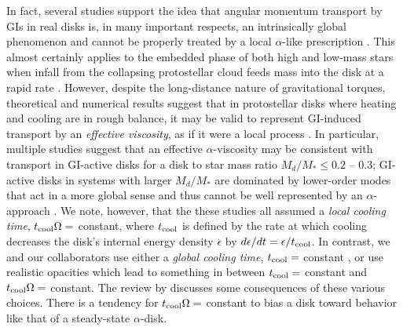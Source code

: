 \documentclass[manuscript]{aastex}
\begin{document}
In fact, several studies support the idea that angular momentum transport by GIs in real disks is, in many important respects, an intrinsically global phenomenon and cannot be properly treated by a local $\alpha$-like prescription \citep{laughlin1996, balbus1999, lodato2005, mejia2005, boley2006, cai2008}.  This almost certainly applies to the embedded phase of both high and low-mass stars when infall from the collapsing protostellar cloud feeds mass into the disk at a rapid
rate \citep[e.g.,][]{yorke1993, laughlin1994, yorke1999,vorobyov2005,vorobyov2006,kratter2010,walch2010}.  
However, despite the long-distance nature of gravitational torques, theoretical and numerical results suggest that in protostellar disks where heating and cooling are in rough balance, 
 it may be valid to represent GI-induced transport by an {\it effective viscosity}, as if it were a local process \citep{gammie2001, lodato2004, rice2005, cossins2009, vorobyov2010}.  In particular, multiple studies suggest that
an effective $\alpha$-viscosity may be consistent
with transport in GI-active disks for a disk to star mass ratio $M_d/M_* \le 0.2$ -- 0.3; GI-active disks
in systems with larger $M_d/M_*$ are dominated by lower-order modes that act in a more global sense and thus cannot be well represented by an $\alpha$-approach
\citep{lodato2004, cossins2009, vorobyov2010}. 
We note, however, that the these studies all assumed
a {\it local cooling time}, $t_{\rm cool}\Omega =$ constant, 
where $t_{\rm cool}$ is defined by the rate at which cooling decreases the disk's internal energy density
$\epsilon$ by $d\epsilon/dt = \epsilon / t_{\rm cool}$.  In contrast, we and our collaborators use either a {\it global cooling time},
$t_{\rm cool} = $ constant \citep[e.g.,][this paper]{pickett2003, mejia2005}, or use realistic opacities \citep[e.g.,][]{mejiaphd2004, cai2006, cai2008, boley2006, boley2007b,  boley2009} which lead to something in between $t_{\rm cool} = $ constant  and
$t_{\rm cool}\Omega =$ constant. The review by \citet{durisen2007} discusses some consequences of these various
choices. There is a tendency for $t_{\rm cool}\Omega =$ constant to bias a disk toward behavior like that of a
steady-state $\alpha$-disk.
\end{document}
